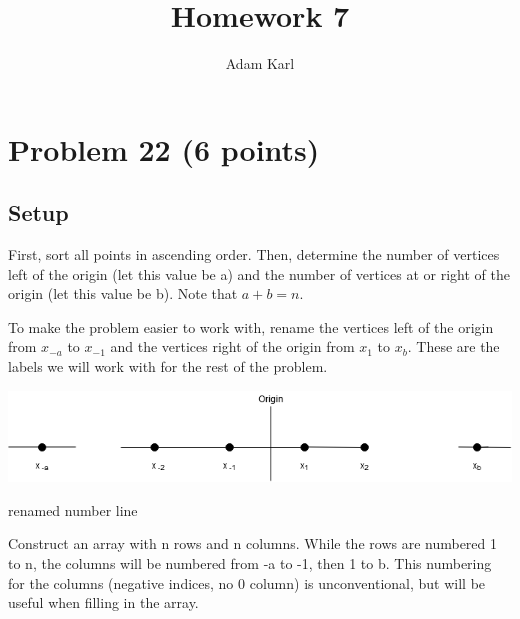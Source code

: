 \documentclass[a4paper]{article}
\title{Homework 7}
\author{Adam Karl}
\begin{document}
\maketitle

\section{Problem 22 (6 points)}
\subsection{Setup}
First, sort all points in ascending order. Then, determine the number of vertices left of the origin (let this value be a) and the number of vertices at or right of the origin (let this value be b). Note that $a + b = n$.

To make the problem easier to work with, rename the vertices left of the origin from $x_{-a}$ to $x_{-1}$ and the vertices right of the origin from $x_1$ to $x_b$. These are the labels we will work with for the rest of the problem.

\begin{center}
    \includegraphics[scale=.75]{numberLine.png}
    \caption{renamed number line}
\end{center}

Construct an array with n rows and n columns. While the rows are numbered 1 to n, the columns will be numbered from -a to -1, then 1 to b. This numbering for the columns (negative indices, no 0 column) is unconventional, but will be useful when filling in the array.
\end{document}
